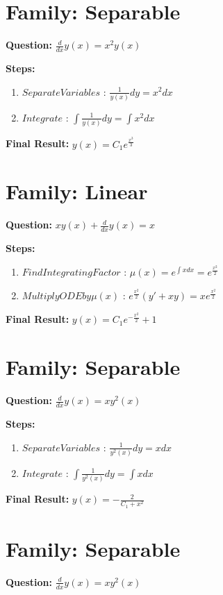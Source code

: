 \documentclass{article}
\begin{document}
\section*{Family: Separable}
\textbf{Question:} $\frac{d}{d x} y{\left(x \right)} = x^{2} y{\left(x \right)}$

\textbf{Steps:}
\begin{enumerate}
\item $Separate Variables$ :  $\frac{1}{y{\left(x \right)}} dy = x^{2} dx$
\item $Integrate$ :  $\int \frac{1}{y{\left(x \right)}} dy = \int x^{2} dx$
\end{enumerate}
\textbf{Final Result:} $y{\left(x \right)} = C_{1} e^{\frac{x^{3}}{3}}$

\section*{Family: Linear}
\textbf{Question:} $x y{\left(x \right)} + \frac{d}{d x} y{\left(x \right)} = x$

\textbf{Steps:}
\begin{enumerate}
\item $Find Integrating Factor$ :  $\mu(x) = e^{\int x dx} = e^{\frac{x^{2}}{2}}$
\item $Multiply ODE by \mu(x)$ :  $e^{\frac{x^{2}}{2}}(y' + xy) = x e^{\frac{x^{2}}{2}}$
\end{enumerate}
\textbf{Final Result:} $y{\left(x \right)} = C_{1} e^{- \frac{x^{2}}{2}} + 1$

\section*{Family: Separable}
\textbf{Question:} $\frac{d}{d x} y{\left(x \right)} = x y^{2}{\left(x \right)}$

\textbf{Steps:}
\begin{enumerate}
\item $Separate Variables$ :  $\frac{1}{y^{2}{\left(x \right)}} dy = x dx$
\item $Integrate$ :  $\int \frac{1}{y^{2}{\left(x \right)}} dy = \int x dx$
\end{enumerate}
\textbf{Final Result:} $y{\left(x \right)} = - \frac{2}{C_{1} + x^{2}}$

\section*{Family: Separable}
\textbf{Question:} $\frac{d}{d x} y{\left(x \right)} = x y^{2}{\left(x \right)}$
\end{document}
